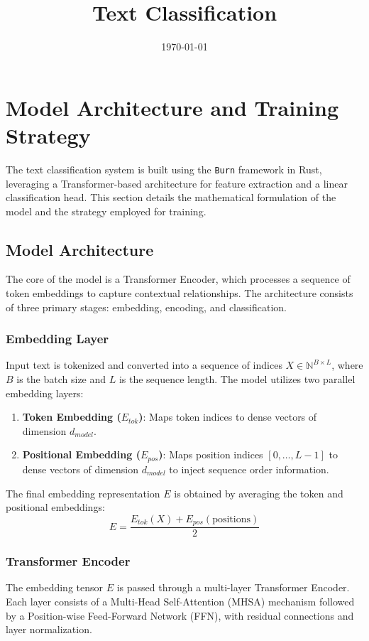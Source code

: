 \documentclass[11pt,a4paper]{article}
\title{\textbf{Text Classification}}
\date{\today}
\begin{document}
\maketitle

\section{Model Architecture and Training Strategy}

The text classification system is built using the \texttt{Burn} framework in Rust, leveraging a Transformer-based architecture for feature extraction and a linear classification head. This section details the mathematical formulation of the model and the strategy employed for training.

\subsection{Model Architecture}
The core of the model is a Transformer Encoder, which processes a sequence of token embeddings to capture contextual relationships. The architecture consists of three primary stages: embedding, encoding, and classification.

\subsubsection{Embedding Layer}
Input text is tokenized and converted into a sequence of indices $X \in \mathbb{N}^{B \times L}$, where $B$ is the batch size and $L$ is the sequence length. The model utilizes two parallel embedding layers:
\begin{enumerate}
    \item \textbf{Token Embedding ($E_{tok}$)}: Maps token indices to dense vectors of dimension $d_{model}$.
    \item \textbf{Positional Embedding ($E_{pos}$)}: Maps position indices $[0, \dots, L-1]$ to dense vectors of dimension $d_{model}$ to inject sequence order information.
\end{enumerate}

The final embedding representation $E$ is obtained by averaging the token and positional embeddings:
\begin{equation}
    E = \frac{E_{tok}(X) + E_{pos}(\text{positions})}{2}
\end{equation}

\subsubsection{Transformer Encoder}
The embedding tensor $E$ is passed through a multi-layer Transformer Encoder. Each layer consists of a Multi-Head Self-Attention (MHSA) mechanism followed by a Position-wise Feed-Forward Network (FFN), with residual connections and layer normalization. 
\end{document}

